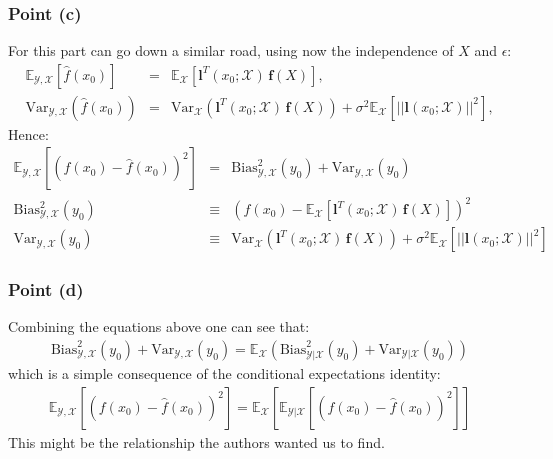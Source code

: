 \subsubsection*{Point (c)}

For this part can go down a similar road, using now the independence of $X$ and $\epsilon$:
\begin{eqnarray*}
\mathbb{E}_{\mathcal{Y},\mathcal{X}} \left[ \hat{f}(x_0) \right] & = & \mathbb{E}_{\mathcal{X}} \left[ \bm{l}^T(x_0; \mathcal{X}) \, \bm{f}(X) \right],\\
\textrm{Var}_{\mathcal{Y},\mathcal{X}}\left( \hat{f}(x_0) \right) & = & \textrm{Var}_{\mathcal{X}} \left( \bm{l}^T(x_0; \mathcal{X}) \, \bm{f}(X) \right) + 
\sigma ^2 \mathbb{E}_{\mathcal{X}} \left[ ||\bm{l}(x_0; \mathcal{X})||^2  \right],
\end{eqnarray*}
Hence:
\begin{eqnarray*}
\mathbb{E}_{\mathcal{Y}, \mathcal{X}} \left[ \left( f(x_0) - \hat{f}(x_0) \right)^2 \right] & = & \textrm{Bias}^2_{\mathcal{Y}, \mathcal{X}}(y_0) + \textrm{Var}_{\mathcal{Y}, \mathcal{X}}(y_0)\\
\textrm{Bias}^2_{\mathcal{Y}, \mathcal{X}}(y_0) & \equiv &\left( f(x_0) - \mathbb{E}_{\mathcal{X}} \left[ \bm{l}^T(x_0; \mathcal{X}) \, \bm{f}(X) \right]  \right)^2\\
\textrm{Var}_{\mathcal{Y}, \mathcal{X}}(y_0) & \equiv & \textrm{Var}_{\mathcal{X}} \left( \bm{l}^T(x_0; \mathcal{X}) \, \bm{f}(X) \right) + 
\sigma ^2 \mathbb{E}_{\mathcal{X}} \left[ ||\bm{l}(x_0; \mathcal{X})||^2  \right]
\end{eqnarray*}

\subsubsection*{Point (d)}

Combining the equations above one can see that:
\begin{eqnarray*}
\textrm{Bias}^2_{\mathcal{Y}, \mathcal{X}}(y_0) + \textrm{Var}_{\mathcal{Y}, \mathcal{X}}(y_0) = \mathbb{E}_{\mathcal{X}} \left( \textrm{Bias}^2_{\mathcal{Y}| \mathcal{X}}(y_0) + \textrm{Var}_{\mathcal{Y}| \mathcal{X}}(y_0) \right)
\end{eqnarray*}
which is a simple consequence of the conditional expectations identity:
\begin{eqnarray*}
\mathbb{E}_{\mathcal{Y}, \mathcal{X}} \left[ \left( f(x_0) - \hat{f}(x_0) \right)^2 \right] =  \mathbb{E}_{\mathcal{X}} \left[ \mathbb{E}_{\mathcal{Y}| \mathcal{X}} \left[ \left( f(x_0) - \hat{f}(x_0) \right)^2 \right]  \right]
\end{eqnarray*}
{\color{red} This might be the relationship the authors wanted us to find.}

